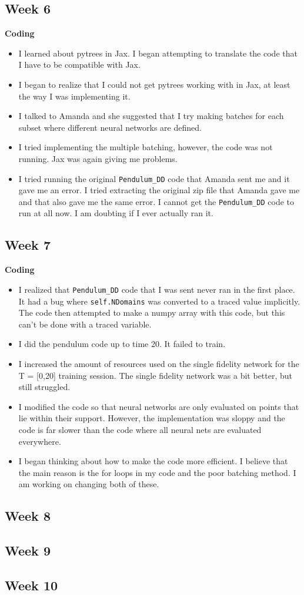 \documentclass{article}
\begin{document}
\subsection*{Week 6}
\textbf{Coding}
\begin{itemize}
\item I learned about pytrees in Jax. I began attempting to translate the code that I have to be compatible with Jax.
\item I began to realize that I could not get pytrees working with in Jax, at least the way I was implementing it.
\item I talked to Amanda and she suggested that I try making batches for each subset where different neural networks are defined.
\item I tried implementing the multiple batching, however, the code was not running. Jax was again giving me problems.
\item I tried running the original \verb|Pendulum_DD| code that Amanda sent me and it gave me an error. I tried extracting the original zip file that Amanda gave me and that also gave me the same error. I cannot get the \verb|Pendulum_DD| code to run at all now. I am doubting if I ever actually ran it.
\end{itemize}
\subsection*{Week 7}
\textbf{Coding}
\begin{itemize}
\item I realized that \verb|Pendulum_DD| code that I was sent never ran  in the first place. It had a bug where \verb|self.NDomains| was converted to a traced value implicitly. The code then attempted to make a numpy array with this code, but this can't be done with a traced variable.
\item I did the pendulum code up to time 20. It failed to train.
\item I increased the amount of resources used on the single fidelity network for the T = [0,20] training session. The single fidelity network was a bit better, but still struggled.
\item I modified the code so that neural networks are only evaluated on points that lie within their support. However, the implementation was sloppy and the code is far slower than the code where all neural nets are evaluated everywhere.
\item I began thinking about how to make the code more efficient. I believe that the main reason is the for loops in my code and the poor batching method. I am working on changing both of these.
\end{itemize}
\newpage 
\subsection*{Week 8} 
\newpage
\subsection*{Week 9}
\newpage
\subsection*{Week 10}  
\newpage
\end{document}
